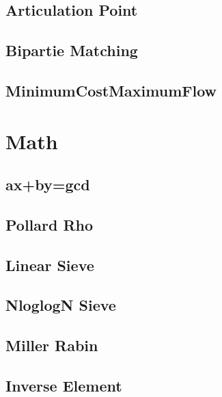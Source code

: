 \documentclass[a4paper,10pt,twocolumn,oneside]{article}
\begin{document}
\subsection{Articulation Point}


\subsection{Bipartie Matching}


\subsection{MinimumCostMaximumFlow}


\section{Math}
\subsection{ax+by=gcd}


\subsection{Pollard Rho}


\subsection{Linear Sieve}


\subsection{NloglogN Sieve}


\subsection{Miller Rabin}


\subsection{Inverse Element}

\end{document}
